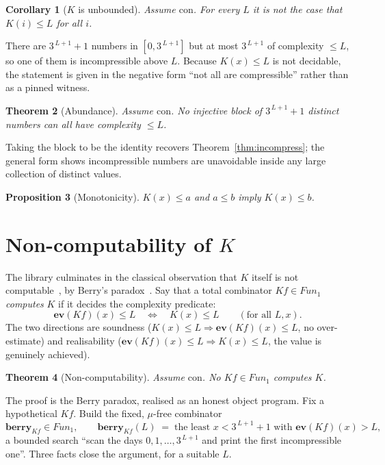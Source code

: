 \documentclass[11pt]{article}
\theoremstyle{plain}
\newtheorem{theorem}{Theorem}[section]
\newtheorem{proposition}[theorem]{Proposition}
\newtheorem{corollary}[theorem]{Corollary}
\theoremstyle{definition}
\theoremstyle{remark}
\newcommand{\ev}{\mathbf{ev}}
\newcommand{\Fun}{\mathit{Fun}}
\newcommand{\Kc}{K}
\newcommand{\Berry}{\mathbf{berry}}
\begin{document}
\begin{corollary}[$\Kc$ is unbounded]\label{cor:unbounded}
Assume $\mathrm{con}$. For every $L$ it is not the case that $\Kc(i)\le L$ for
all $i$.
\end{corollary}

There are $3^{\,L+1}+1$ numbers in $[0,3^{\,L+1}]$ but at most $3^{\,L+1}$
of complexity $\le L$, so one of them is incompressible above $L$. Because
$\Kc(x)\le L$ is not decidable, the statement is given in the negative
form ``not all are compressible'' rather than as a pinned witness.

\begin{theorem}[Abundance]\label{thm:abundance}
Assume $\mathrm{con}$. No injective block of $3^{\,L+1}+1$ distinct numbers can
all have complexity $\le L$.
\end{theorem}

Taking the block to be the identity recovers
Theorem~\ref{thm:incompress}; the general form shows incompressible
numbers are unavoidable inside any large collection of distinct values.

\begin{proposition}[Monotonicity]\label{prop:mono}
$\Kc(x)\le a$ and $a\le b$ imply $\Kc(x)\le b$.
\end{proposition}

\section{Non-computability of $\Kc$}

The library culminates in the classical observation that $\Kc$ itself is
not computable~\cite{Chaitin74,LiVitanyi}, by Berry's
paradox~\cite{Russell08}. Say that a total combinator $K\!f\in\Fun_1$
\emph{computes} $\Kc$ if it decides the complexity predicate:
\[
  \ev(K\!f)(x)\le L \quad\Longleftrightarrow\quad \Kc(x)\le L
  \qquad(\text{for all }L,x).
\]
The two directions are soundness ($\Kc(x)\le L\Rightarrow\ev(K\!f)(x)\le
L$, no over-estimate) and realisability ($\ev(K\!f)(x)\le L\Rightarrow
\Kc(x)\le L$, the value is genuinely achieved).

\begin{theorem}[Non-computability]\label{thm:noncomp}
Assume $\mathrm{con}$. No $K\!f\in\Fun_1$ computes $\Kc$.
\end{theorem}

The proof is the Berry paradox, realised as an honest object program.
Fix a hypothetical $K\!f$. Build the fixed, $\mu$-free combinator
\[
  \Berry_{K\!f}\in\Fun_1,\qquad
  \Berry_{K\!f}(L) \;=\; \text{the least } x<3^{\,L+1}+1
                          \text{ with } \ev(K\!f)(x)>L,
\]
a bounded search ``scan the days $0,1,\dots,3^{\,L+1}$ and print the first
incompressible one''. Three facts close the argument, for a suitable $L$.
\end{document}
